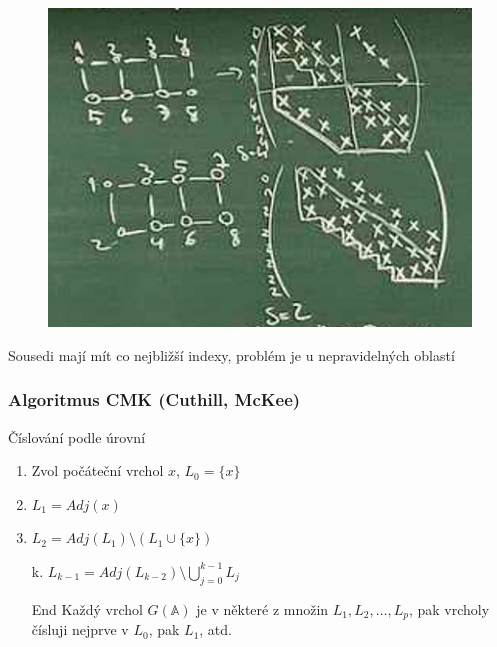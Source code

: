 \documentclass[../main.tex]{subfiles}
\begin{document}
\begin{example}
    \begin{figure}[H]
        \centering
        \includegraphics{images/26-10-zaplneni-uvnitr.png}
    \end{figure}
    
Sousedi mají mít co nejbližší indexy, problém je u nepravidelných oblastí
\end{example}



\subsubsection{Algoritmus CMK (Cuthill, McKee)}
Číslování podle úrovní

\begin{enumerate}
    \item Zvol počáteční vrchol $x$, $L_0 = \{x\}$
    \item $L_1 = Adj(x)$
    \item $L_2 = Adj(L_1)\setminus(L_1 \cup \{x\})$
    \item[k.] $L_{k-1} = Adj(L_{k-2}) \setminus \bigcup_{j=0}^{k-1} L_j$  
    \item[End] Každý vrchol $G(\mathbb{A})$ je v některé z množin $L_1,L_2,\dots,L_p$, pak vrcholy čísluji nejprve v $L_0$, pak $L_1$, atd.   
\end{enumerate}
\end{document}
